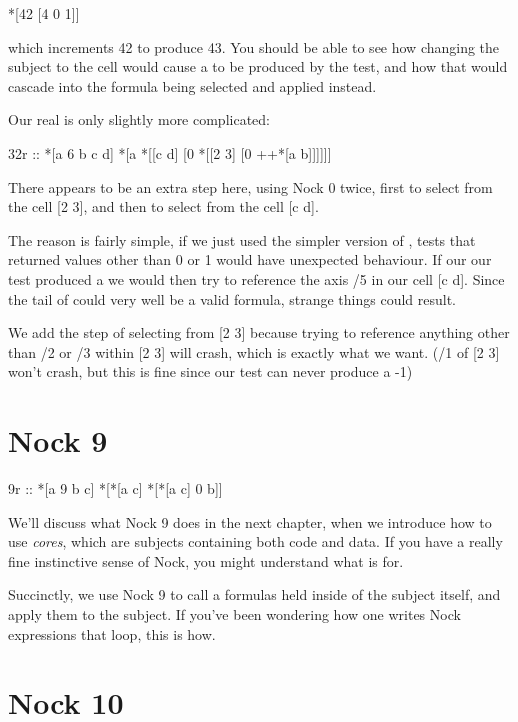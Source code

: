 \begin{code}
*[42 [4 0 1]]
\end{code}
which increments 42 to produce 43. You should be able to see how changing the subject to the cell \kode{[40 43]} would cause a  to be produced by the test, and how that would cascade into the  formula \kode{[4 0 2]} being selected and applied instead.

Our real  is only slightly more complicated:

\begin{code}
32r ::    *[a 6 b c d]     *[a *[[c d] [0 *[[2 3] [0 ++*[a b]]]]]]
\end{code}
There appears to be an extra step here, using Nock 0 twice, first to select from the cell [2 3], and then to select from the cell [c d].

The reason is fairly simple, if we just used the simpler version of , tests that returned values other than 0 or 1 would have unexpected behaviour. If our our test produced a  we would then try to reference the axis /5 in our cell [c d]. Since the tail of  could very well be a valid formula, strange things could result.

We add the step of selecting from [2 3] because trying to reference anything other than /2 or /3 within [2 3] will crash, which is exactly what we want. (/1 of [2 3] won't crash, but this is fine since our test can never produce a -1)

\section{Nock 9}

\begin{code}
9r ::     *[a 9 b c]        *[*[a c] *[*[a c] 0 b]]
\end{code}
We'll discuss what Nock 9 does in the next chapter, when we introduce how to
use \emph{cores}, which are subjects containing both code and data.  If you have a
really fine instinctive sense of Nock, you might understand what  is for.

Succinctly, we use Nock 9 to call a formulas held inside of the subject itself,
and apply them to the subject. If you've been wondering how one writes Nock
expressions that loop, this is how.

\section{Nock 10}

